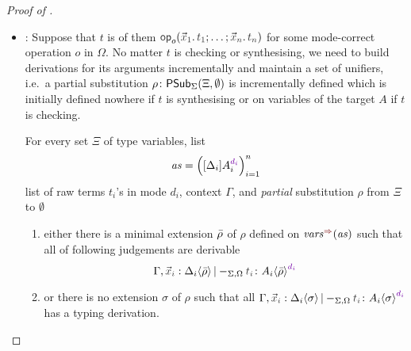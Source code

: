 \begin{proof}[Proof of {}]
\begin{itemize}
    \item {}:
      Suppose that $t$ is of them $\tmOpts$ for some mode-correct operation $o$ in $\Omega$.
      No matter $t$ is checking or synthesising, we need to build derivations for its arguments incrementally and maintain a set of unifiers, i.e.\ a partial substitution $\rho\colon \mathsf{PSub}_{\Sigma}(\Xi,\emptyset)$ is incrementally defined which is initially defined nowhere if $t$ is synthesising or on variables of the target $A$ if $t$ is checking. 

  \begin{claim}\label{lem:args-induction}
    For every set $\Xi$ of type variables, list 
    \[
      \mathit{as} = \left([\Delta_i] A_{i}^{\dir{d_i}}\right)_{i = 1}^{n}
    \]
    list of raw terms $t_i$'s in mode $d_i$, context $\Gamma$, and \emph{partial} substitution $\rho$ from $\Xi$ to $\emptyset$
    \begin{enumerate}
      \item either there is a minimal extension $\bar{\rho}$ of $\rho$ defined on $\synvar(\mathit{as})$ such that all of following judgements are derivable
        \[
          \Gamma, \vars{x}_\isTerm{i} : \simsub{\Delta_i}{\ext{\rho}} |-_{\Sigma, \Omega} \isTerm{t_i} \colon \simsub{A_i}{\ext{\rho}}^{\dir{d_i}}
        \]

      \item or there is no extension $\sigma$ of $\rho$ such that all $\Gamma, \vars{x}_\isTerm{i} : \simsub{\Delta_i}{\sigma} |-_{\Sigma, \Omega} \isTerm{t_i} \colon \simsub{A_i}{\sigma}^{\dir{d_i}}$ has a typing derivation. 
    \end{enumerate}
  \end{claim}
  \end{itemize}
\end{proof}
